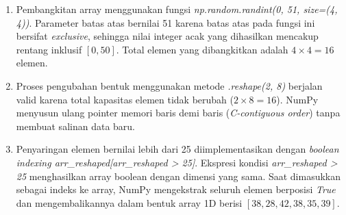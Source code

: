\documentclass[12pt,a4paper]{article}
\begin{document}
\begin{enumerate}[label=\arabic*), leftmargin=3.00cm, labelwidth=0.75cm, labelsep=0cm, align=left]
    \item Pembangkitan array menggunakan fungsi \textit{np.random.randint(0, 51, size=(4, 4))}. Parameter batas atas bernilai 51 karena batas atas pada fungsi ini bersifat \textit{exclusive}, sehingga nilai integer acak yang dihasilkan mencakup rentang inklusif $[0, 50]$. Total elemen yang dibangkitkan adalah $4 \times 4 = 16$ elemen.
    \item Proses pengubahan bentuk menggunakan metode \textit{.reshape(2, 8)} berjalan valid karena total kapasitas elemen tidak berubah ($2 \times 8 = 16$). NumPy menyusun ulang pointer memori baris demi baris (\textit{C-contiguous order}) tanpa membuat salinan data baru.
    \item Penyaringan elemen bernilai lebih dari 25 diimplementasikan dengan \textit{boolean indexing arr\_reshaped[arr\_reshaped > 25]}. Ekspresi kondisi \textit{arr\_reshaped > 25} menghasilkan array boolean dengan dimensi yang sama. Saat dimasukkan sebagai indeks ke array, NumPy mengekstrak seluruh elemen berposisi \textit{True} dan mengembalikannya dalam bentuk array 1D berisi $[38, 28, 42, 38, 35, 39]$.
\end{enumerate}
\end{document}

